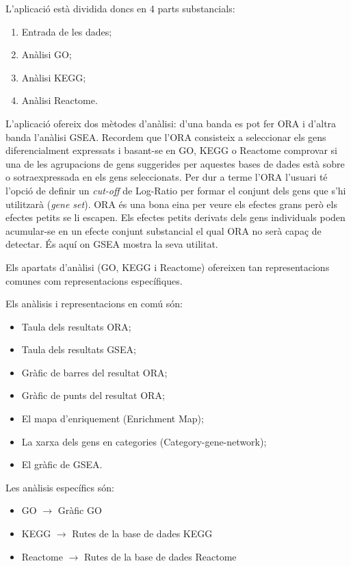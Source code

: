 L'aplicació està dividida doncs en 4 parts substancials:

\begin{enumerate}
\item Entrada de les dades;
\item Anàlisi \gls{GO};
\item Anàlisi \gls{KEGG};
\item Anàlisi Reactome.
\end{enumerate}


L'aplicació ofereix dos mètodes d'anàlisi: d'una banda es pot fer \gls{ORA} i d'altra banda l'anàlisi \gls{GSEA}. Recordem que l'ORA consisteix a seleccionar els gens diferencialment expressats i basant-se en GO, KEGG o Reactome comprovar si una de les agrupacions de gens suggerides per aquestes bases de dades està sobre o sotraexpressada en els gens seleccionats. Per dur a terme l'ORA l'usuari té l’opció de definir un \textit{cut-off} de Log-Ratio per formar el conjunt dels gens que s'hi utilitzarà (\textit{gene set}). ORA és una bona eina per veure els efectes grans però els efectes petits se li escapen. Els efectes petits derivats dels gens individuals poden acumular-se en un efecte conjunt substancial el qual ORA no serà capaç de detectar. És aquí on GSEA mostra la seva utilitat. 

Els apartats d'anàlisi (\gls{GO}, \gls{KEGG} i Reactome) ofereixen tan representacions comunes com representacions específiques. 

Els anàlisis i representacions en comú són:

\begin{itemize}
\item Taula dels resultats \gls{ORA};
\item Taula dels resultats \gls{GSEA};
\item Gràfic de barres del resultat \gls{ORA};
\item Gràfic de punts del resultat \gls{ORA};
\item El mapa d'enriquement (\gls{Enrichment Map});
\item La xarxa dels gens en categories (Category-gene-network);
\item El gràfic de \gls{GSEA}.
\end{itemize} 

Les anàlisis específics són:

\begin{itemize}
\item GO $\rightarrow$ Gràfic \gls{GO} 
\item KEGG $\rightarrow$ Rutes de la base de dades \gls{KEGG}
\item Reactome $\rightarrow$ Rutes de la base de dades Reactome
\end{itemize}

